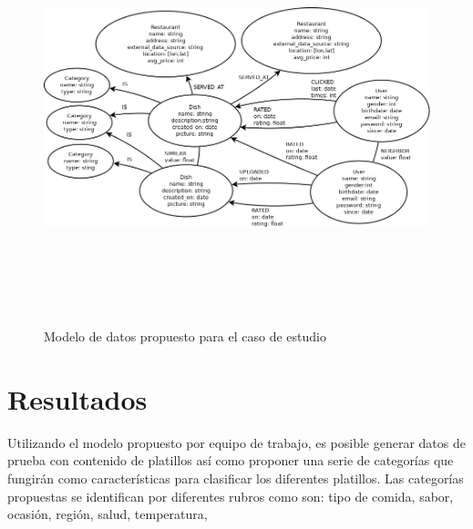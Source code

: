       \begin{landscape}
        \begin{figure}[h!]
          \centering
          \includegraphics[width=22.5cm,height=12cm]{./images/sc_data_model.png}
          \caption{Modelo de datos propuesto para el caso de estudio}
        \end{figure}
      \end{landscape}

  \section{Resultados}
    Utilizando el modelo propuesto por equipo de trabajo, es posible generar datos de prueba con contenido de platillos así como proponer una serie de categorías que fungirán como características para clasificar los diferentes platillos. Las categorías propuestas se identifican por diferentes rubros como son: tipo de comida, sabor, ocasión, región, salud, temperatura, 

